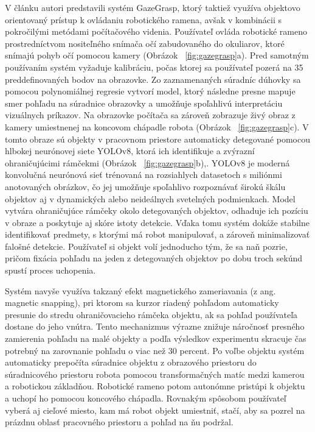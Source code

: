 V článku \cite{GazeGrasp:_DNN-Driven_Robotic_Grasping_with_Wearable_Eye-Gaze_Interface} autori predstavili systém GazeGrasp, ktorý taktiež využíva objektovo orientovaný prístup k ovládaniu robotického ramena, avšak v kombinácii s pokročilými metódami počítačového videnia. Používateľ ovláda robotické rameno prostredníctvom nositeľného snímača očí zabudovaného do okuliarov, ktoré snímajú pohyb očí pomocou kamery (Obrázok ~\ref{fig:gazegrasp}a). Pred samotným používaním systém vyžaduje kalibráciu, počas ktorej sa používateľ pozerá na 35 preddefinovaných bodov na obrazovke. Zo zaznamenaných súradníc dúhovky sa pomocou polynomiálnej regresie vytvorí model, ktorý následne presne mapuje smer pohľadu na súradnice obrazovky a umožňuje spoľahlivú interpretáciu vizuálnych príkazov. Na obrazovke počítača sa zároveň zobrazuje živý obraz z kamery umiestnenej na koncovom chápadle robota (Obrázok ~\ref{fig:gazegrasp}c). V tomto obraze sú objekty v pracovnom priestore automaticky detegované pomocou hlbokej neurónovej siete YOLOv8, ktorá ich identifikuje a zvýrazní ohraničujúcimi rámčekmi (Obrázok ~\ref{fig:gazegrasp}b),. YOLOv8 je moderná konvolučná neurónová sieť trénovaná na rozsiahlych datasetoch s miliónmi anotovaných obrázkov, čo jej umožňuje spoľahlivo rozpoznávať širokú škálu objektov aj v dynamických alebo neideálnych svetelných podmienkach. Model vytvára ohraničujúce rámčeky okolo detegovaných objektov, odhaduje ich pozíciu v obraze a poskytuje aj skóre istoty detekcie. Vďaka tomu systém dokáže stabilne identifikovať predmety, s ktorými má robot manipulovať, a zároveň minimalizovať falošné detekcie. Používateľ si objekt volí jednoducho tým, že sa naň pozrie, pričom fixácia pohľadu na jeden z detegovaných objektov po dobu troch sekúnd spustí proces uchopenia.

Systém navyše využíva takzaný efekt magnetického zameriavania (z ang. magnetic snapping), pri ktorom sa kurzor riadený pohľadom automaticky presunie do stredu ohraničovacieho rámčeka objektu, ak sa pohľad používateľa dostane do jeho vnútra. Tento mechanizmus výrazne znižuje náročnosť presného zamierenia pohľadu na malé objekty a podľa výsledkov experimentu skracuje čas potrebný na zarovnanie pohľadu o viac než 30 percent. Po voľbe objektu systém automaticky prepočíta súradnice objektu z obrazového priestoru do súradnicového priestoru robota pomocou transformačných matíc medzi kamerou a robotickou základňou. Robotické rameno potom autonómne pristúpi k objektu a uchopí ho pomocou koncového chápadla. Rovnakým spôsobom používateľ vyberá aj cieľové miesto, kam má robot objekt umiestniť, stačí, aby sa pozrel na prázdnu oblasť pracovného priestoru a pohľad na ňu podržal.

